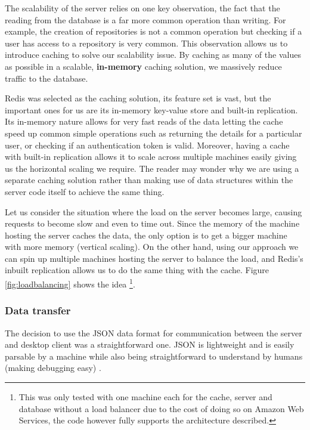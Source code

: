 The scalability of the server relies on one key observation, the fact that the reading from the database is a far more common operation than writing. For example, the creation of repositories is not a common operation but checking if a user has access to a repository is very common. This observation allows us to introduce caching to solve our scalability issue. By caching as many of the values as possible in a scalable, \textbf{in-memory} caching solution, we massively reduce traffic to the database.

Redis \cite{redis} was selected as the caching solution, its feature set is vast, but the important ones for us are its in-memory key-value store and built-in replication. Its in-memory nature allows for very fast reads of the data letting the cache speed up common simple operations such as returning the details for a particular user, or checking if an authentication token is valid.  Moreover, having a cache with built-in replication allows it to scale across multiple machines easily giving us the horizontal scaling we require. The reader may wonder why we are using a separate caching solution rather than making use of data structures within the server code itself to achieve the same thing.

Let us consider the situation where the load on the server becomes large, causing requests to become slow and even to time out. Since the memory of the machine hosting the server caches the data, the only option is to get a bigger machine with more memory (vertical scaling). On the other hand, using our approach we can spin up multiple machines hosting the server to balance the load, and Redis's inbuilt replication allows us to do the same thing with the cache. Figure \ref{fig:loadbalancing} shows the idea \footnote{This was only tested with one machine each for the cache, server and database without a load balancer due to the cost of doing so on Amazon Web Services, the code however fully supports the architecture described.}.


\subsubsection{Data transfer}

The decision to use the JSON data format for communication between the server and desktop client was a straightforward one. JSON is lightweight and is easily parsable by a machine while also being straightforward to understand by humans (making debugging easy) \cite{json}.

